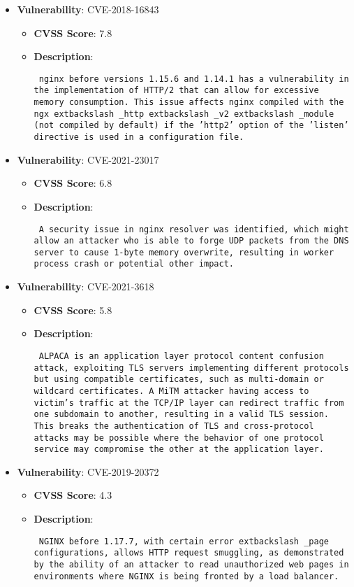 \documentclass{article}
\begin{document}
\begin{itemize}
        \item \textbf{Vulnerability}: CVE-2018-16843
        \begin{itemize}
            \item \textbf{CVSS Score}:  7.8 
            \item \textbf{Description}: \parbox{\linewidth}{\texttt{ nginx before versions 1.15.6 and 1.14.1 has a vulnerability in the implementation of HTTP/2 that can allow for excessive memory consumption. This issue affects nginx compiled with the ngx	extbackslash _http	extbackslash _v2	extbackslash _module (not compiled by default) if the 'http2' option of the 'listen' directive is used in a configuration file. }}
        \end{itemize}
    
        \item \textbf{Vulnerability}: CVE-2021-23017
        \begin{itemize}
            \item \textbf{CVSS Score}:  6.8 
            \item \textbf{Description}: \parbox{\linewidth}{\texttt{ A security issue in nginx resolver was identified, which might allow an attacker who is able to forge UDP packets from the DNS server to cause 1-byte memory overwrite, resulting in worker process crash or potential other impact. }}
        \end{itemize}
    
        \item \textbf{Vulnerability}: CVE-2021-3618
        \begin{itemize}
            \item \textbf{CVSS Score}:  5.8 
            \item \textbf{Description}: \parbox{\linewidth}{\texttt{ ALPACA is an application layer protocol content confusion attack, exploiting TLS servers implementing different protocols but using compatible certificates, such as multi-domain or wildcard certificates. A MiTM attacker having access to victim's traffic at the TCP/IP layer can redirect traffic from one subdomain to another, resulting in a valid TLS session. This breaks the authentication of TLS and cross-protocol attacks may be possible where the behavior of one protocol service may compromise the other at the application layer. }}
        \end{itemize}
    
        \item \textbf{Vulnerability}: CVE-2019-20372
        \begin{itemize}
            \item \textbf{CVSS Score}:  4.3 
            \item \textbf{Description}: \parbox{\linewidth}{\texttt{ NGINX before 1.17.7, with certain error	extbackslash _page configurations, allows HTTP request smuggling, as demonstrated by the ability of an attacker to read unauthorized web pages in environments where NGINX is being fronted by a load balancer. }}
        \end{itemize}
    

\end{itemize}
\end{document}
